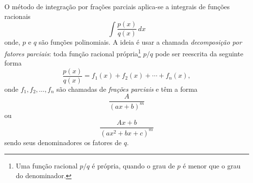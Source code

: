 O método de integração por frações parciais aplica-se a integrais de funções racionais
\begin{equation}
  \int \frac{p(x)}{q(x)}\,dx
\end{equation}
onde, $p$ e $q$ são funções polinomiais. A ideia é usar a chamada \emph{decomposição por fatores parciais}: toda função racional própria\footnote{Uma função racional $p/q$ é própria, quando o grau de $p$ é menor que o grau do denominador.} $p/q$ pode ser reescrita da seguinte forma
\begin{equation}
  \frac{p(x)}{q(x)} = f_1(x) + f_2(x) + \cdots + f_n(x),
\end{equation}
onde $f_1, f_2, \dotsc, f_n$ são chamadas de \emph{frações parciais} e têm a forma
\begin{equation}
  \frac{A}{(ax + b)^m}
\end{equation}
ou
\begin{equation}
  \frac{Ax + b}{(ax^2 + bx + c)^m}
\end{equation}
sendo seus denominadores os fatores de $q$.

